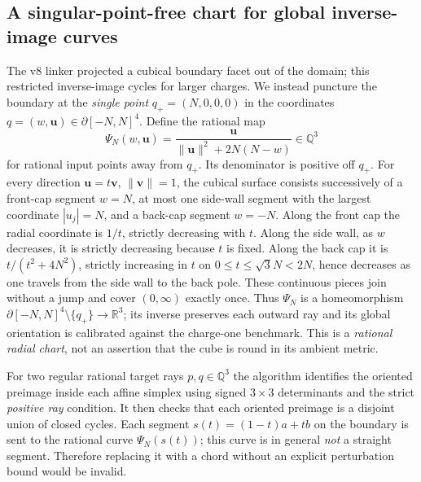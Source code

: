 \documentclass[aps,prd,onecolumn,notitlepage,11pt,superscriptaddress,longbibliography]{revtex4-2}
\begin{document}
\subsection{A singular-point-free chart for global inverse-image curves}
The v8 linker projected a cubical boundary facet out of the domain; this restricted inverse-image cycles for larger charges. We instead puncture the boundary at the \emph{single point} $q_+=(N,0,0,0)$ in the coordinates $q=(w,\bm u)\in\partial[-N,N]^4$. Define the rational map
\begin{equation}\label{eq:v10-chart}
 \boxed{\quad \Psi_N(w,\bm u)=\frac{\bm u}{\|\bm u\|^2+2N(N-w)}\in\mathbb Q^3\quad}
\end{equation}
for rational input points away from $q_+$. Its denominator is positive off $q_+$. For every direction $\bm u=t\bm v$, $\|\bm v\|=1$, the cubical surface consists successively of a front-cap segment $w=N$, at most one side-wall segment with the largest coordinate $|u_j|=N$, and a back-cap segment $w=-N$. Along the front cap the radial coordinate is $1/t$, strictly decreasing with $t$. Along the side wall, as $w$ decreases, it is strictly decreasing because $t$ is fixed. Along the back cap it is $t/(t^2+4N^2)$, strictly increasing in $t$ on $0\le t\le\sqrt3N<2N$, hence decreases as one travels from the side wall to the back pole. These continuous pieces join without a jump and cover $(0,\infty)$ exactly once. Thus $\Psi_N$ is a homeomorphism $\partial[-N,N]^4\setminus\{q_+\}\to\mathbb R^3$; its inverse preserves each outward ray and its global orientation is calibrated against the charge-one benchmark. This is a \emph{rational radial chart}, not an assertion that the cube is round in its ambient metric.

For two regular rational target rays $p,q\in\mathbb Q^3$ the algorithm identifies the oriented preimage inside each affine simplex using signed $3\times3$ determinants and the strict \emph{positive ray} condition. It then checks that each oriented preimage is a disjoint union of closed cycles. Each segment $s(t)=(1-t)a+tb$ on the boundary is sent to the rational curve $\Psi_N(s(t))$; this curve is in general \emph{not} a straight segment. Therefore replacing it with a chord without an explicit perturbation bound would be invalid.
\end{document}
